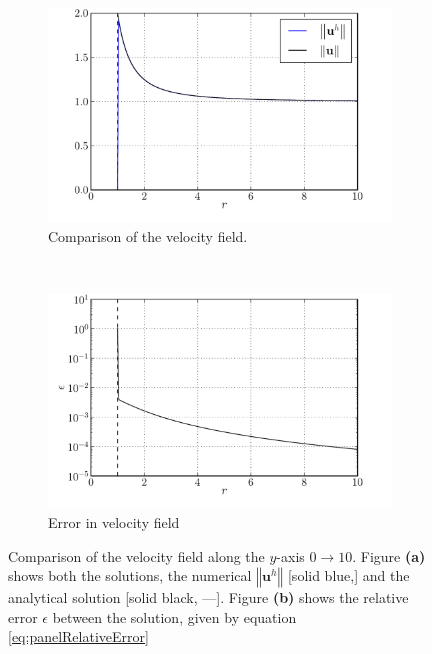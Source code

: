 \begin{figure}[!b]
        \centering
        \begin{subfigure}[b]{0.5\textwidth}
                \includegraphics[width=\textwidth]{figures/lagrangian/panelCylinder_versusAnalytical.pdf}
                \caption{Comparison of the velocity field.}
                \label{fig:panelCylinder_versusAnalytical}
        \end{subfigure}%
        ~ %
        \begin{subfigure}[b]{0.5\textwidth}
                \includegraphics[width=\textwidth]{figures/lagrangian/panelCylinder_error.pdf}
                \caption{Error in velocity field}
                \label{fig:panelCylinder_error}
        \end{subfigure}
        \caption{Comparison of the velocity field along the $y$-axis $0\rightarrow10$. Figure \textbf{(a)} shows both the solutions, the numerical $\left\Vert\mathbf{u}^h\right\Vert$ [solid blue,{\color{plotBlue}{---}}] and the analytical solution [solid black, ---]. Figure \textbf{(b)} shows the relative error $\epsilon$ between the solution, given by equation \ref{eq:panelRelativeError}}
        \label{fig:panelCylinderComparision}
\end{figure}	

